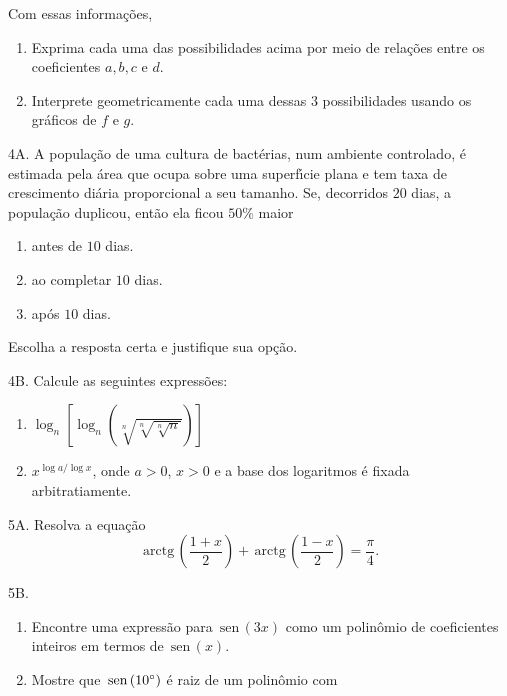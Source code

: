 \documentclass{prova}
\newcommand{\ds}{\displaystyle}
\newcommand{\sen}{\,\mbox{sen}\,}
\newcommand{\arctg}{\,\mbox{arctg}\,}
\begin{document}
\begin{questionario}
\begin{enumerate}
            \end{enumerate}
            Com essas informa\c{c}\~oes,
            \begin{enumerate}
                \item Exprima cada uma das possibilidades acima por meio de
                    rela\c{c}\~oes entre os coeficientes $a,b,c$ e $d$.
                \item Interprete geometricamente cada uma dessas $3$
                    possibilidades usando os gr\'aficos de $f$ e $g$.
            \end{enumerate}
        \item[4A.] A popula\c{c}\~ao de uma cultura de bact\'erias, num ambiente
            controlado, \'e estimada pela \'area que ocupa sobre uma superf\'{\i}cie plana e tem
            taxa de crescimento di\'aria proporcional a seu tamanho. Se, decorridos $20$
            dias, a popula\c{c}\~ao duplicou, ent\~ao ela ficou $50\%$ maior
            \begin{enumerate}
                \item antes de $10$ dias.
                \item ao completar $10$ dias.
                \item ap\'os $10$ dias.
            \end{enumerate}
            Escolha a resposta certa e justifique sua op\c{c}\~ao.
        \item[4B.] Calcule as seguintes express\~oes:
            \begin{enumerate}
                \item $\ds\log_n\left[\log_n\left(\sqrt[n]{\sqrt[n]{\sqrt[n]{n}}}\right)\right]$
                \item $\ds x^{\log a/\log x}$, onde $a>0$, $x>0$ e a base dos
                    logaritmos \'e fixada arbitratiamente.
            \end{enumerate}
        \item[5A.] Resolva a equa\c{c}\~ao
            \[\arctg\left(\frac{1+x}{2}\right) + \arctg\left(\frac{1-x}{2}\right) = \frac{\pi}{4}.\]
        \item[5B.]
            \begin{enumerate}
                \item Encontre uma express\~ao para $\sen(3x)$ como um polin\^omio
                    de coeficientes inteiros em termos de $\sen(x)$.
                \item Mostre que $\sen(10\degree)$ \'e raiz de um polin\^omio com

\end{enumerate}
\end{questionario}
\end{document}
